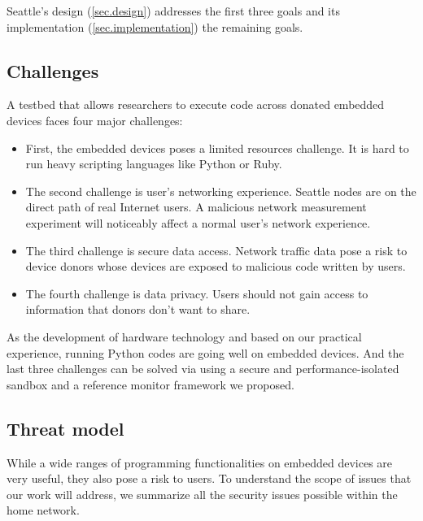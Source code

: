 Seattle's design (\ref{sec.design}) addresses the first three goals and its implementation (\ref{sec.implementation}) the remaining goals.

\subsection{Challenges}
\label{ssec.challenges}
A testbed that allows researchers to execute code across donated embedded devices faces four major challenges: 
\begin{itemize}
\item First, the embedded devices poses a limited resources challenge. It is hard to run heavy scripting languages like Python or Ruby. 
\item The second challenge is user's networking experience. Seattle nodes are on the direct path of real Internet users. A malicious network measurement experiment will noticeably affect a normal user's network experience. 
\item The third challenge is secure data access. Network traffic data pose a risk to device donors whose devices are exposed to malicious code written by users. 
\item The fourth challenge is data privacy. Users should not gain access to information that donors don't want to share.
\end{itemize}
As the development of hardware technology and based on our practical experience, running Python codes are going well on embedded devices. And the last three challenges can be solved via using a secure and performance-isolated sandbox and a reference monitor framework we proposed.

\subsection{Threat model}
\label{ssec.threat_models}
While a wide ranges of programming functionalities on embedded devices are 
very useful, they also pose a risk to users. To understand the scope of 
issues that our work will address, we summarize all the security issues 
possible within the home network.


